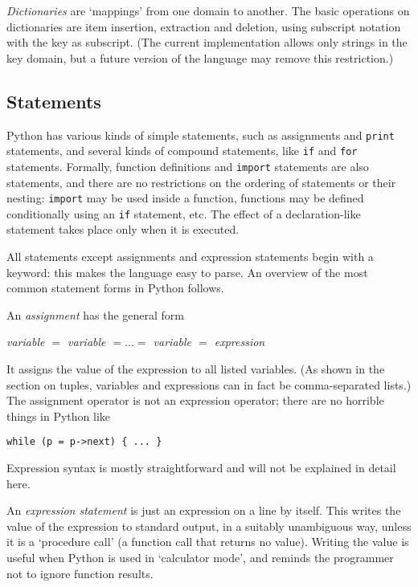 {\em Dictionaries} are `mappings' from one domain to another.  The
basic operations on dictionaries are item insertion, extraction and
deletion, using subscript notation with the key as subscript.  (The
current implementation allows only strings in the key domain, but a
future version of the language may remove this restriction.)

\subsection{Statements}

Python has various kinds of simple statements, such as assignments
and {\tt print} statements, and several kinds of compound statements,
like {\tt if} and {\tt for} statements.  Formally, function
definitions and {\tt import} statements are also statements, and there
are no restrictions on the ordering of statements or their nesting:
{\tt import} may be used inside a function, functions may be defined
conditionally using an {\tt if} statement, etc.  The effect of a
declaration-like statement takes place only when it is executed.

All statements except assignments and expression statements begin with
a keyword: this makes the language easy to parse.  An overview of the
most common statement forms in Python follows.

An {\em assignment} has the general form
\vspace{\itemsep}

\noindent
{\em variable $=$ variable $= ... =$ variable $=$ expression}
\vspace{\itemsep}

It assigns the value of the expression to all listed variables.  (As
shown in the section on tuples, variables and expressions can in fact
be comma-separated lists.)  The assignment operator is not an
expression operator; there are no horrible things in Python like
\begin{verbatim}
while (p = p->next) { ... }
\end{verbatim}
Expression syntax is mostly straightforward and will not be explained
in detail here.

An {\em expression statement} is just an expression on a line by
itself.  This writes the value of the expression to standard output,
in a suitably unambiguous way, unless it is a `procedure call' (a
function call that returns no value).  Writing the value is useful
when Python is used in `calculator mode', and reminds the programmer
not to ignore function results.

